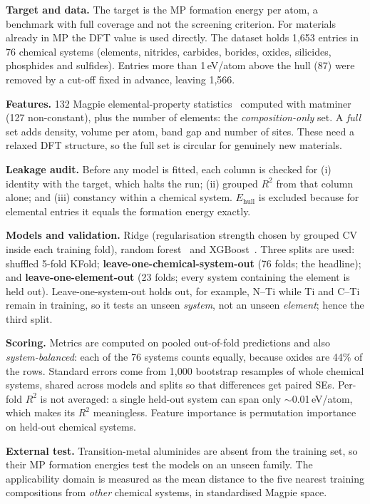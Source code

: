 \documentclass{report}
\newcommand{\Ehull}{E_{\mathrm{hull}}}
\begin{document}
\noindent\textbf{Target and data.} The target is the MP formation energy per atom, a benchmark with full coverage and not the screening criterion. For materials already in MP the DFT value is used directly. The dataset holds 1,653 entries in 76 chemical systems (elements, nitrides, carbides, borides, oxides, silicides, phosphides and sulfides). Entries more than 1\,eV/atom above the hull (87) were removed by a cut-off fixed in advance, leaving 1,566.

\noindent\textbf{Features.} 132 Magpie elemental-property statistics~\citep{Ward2016} computed with matminer~\citep{Ward2018} (127 non-constant), plus the number of elements: the \emph{composition-only} set. A \emph{full} set adds density, volume per atom, band gap and number of sites. These need a relaxed DFT structure, so the full set is circular for genuinely new materials.

\noindent\textbf{Leakage audit.} Before any model is fitted, each column is checked for (i) identity with the target, which halts the run; (ii) grouped $R^2$ from that column alone; and (iii) constancy within a chemical system. $\Ehull$ is excluded because for elemental entries it equals the formation energy exactly.

\noindent\textbf{Models and validation.} Ridge (regularisation strength chosen by grouped CV inside each training fold), random forest~\citep{Pedregosa2011} and XGBoost~\citep{Chen2016}. Three splits are used: shuffled 5-fold KFold; \textbf{leave-one-chemical-system-out} (76 folds; the headline); and \textbf{leave-one-element-out} (23 folds; every system containing the element is held out). Leave-one-system-out holds out, for example, N--Ti while Ti and C--Ti remain in training, so it tests an unseen \emph{system}, not an unseen \emph{element}; hence the third split.

\noindent\textbf{Scoring.} Metrics are computed on pooled out-of-fold predictions and also \emph{system-balanced}: each of the 76 systems counts equally, because oxides are 44\% of the rows. Standard errors come from 1,000 bootstrap resamples of whole chemical systems, shared across models and splits so that differences get paired SEs. Per-fold $R^2$ is not averaged: a single held-out system can span only $\sim$0.01\,eV/atom, which makes its $R^2$ meaningless. Feature importance is permutation importance on held-out chemical systems.

\noindent\textbf{External test.} Transition-metal aluminides are absent from the training set, so their MP formation energies test the models on an unseen family. The applicability domain is measured as the mean distance to the five nearest training compositions from \emph{other} chemical systems, in standardised Magpie space.
\end{document}
